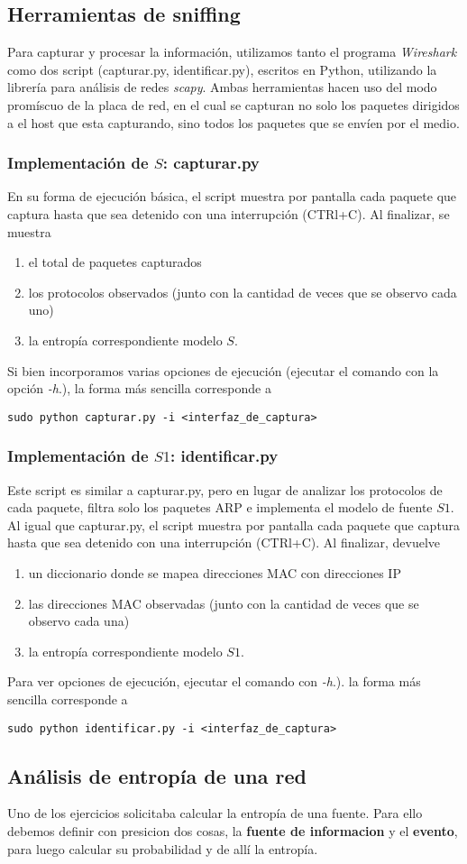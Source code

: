 \subsection{Herramientas de sniffing}

Para capturar y procesar la información, utilizamos tanto el programa \textit{Wireshark} como dos script (capturar.py, identificar.py), escritos en Python, utilizando la librería para análisis de redes \textit{scapy}. Ambas herramientas hacen uso del modo promíscuo de la placa de red, en el cual se capturan no solo los paquetes dirigidos a el host que esta capturando, sino todos los paquetes que se envíen por el medio.

\subsubsection{Implementación de $S$: capturar.py}
En su forma de ejecución básica, el script muestra por pantalla cada paquete que captura hasta que sea detenido con una interrupción (CTRl+C). Al finalizar, se muestra 
\begin{enumerate}
	\item el total de paquetes capturados
	\item los protocolos observados (junto con la cantidad de veces que se observo cada uno)
	\item la entropía correspondiente modelo $S$. 
\end{enumerate}
Si bien incorporamos varias opciones de ejecución (ejecutar el comando con la opción \textit{-h}.), la forma más sencilla corresponde a 
\begin{verbatim}
sudo python capturar.py -i <interfaz_de_captura>
\end{verbatim}

\subsubsection{Implementación de $S1$: identificar.py}
Este script es similar a capturar.py, pero en lugar de analizar los protocolos de cada paquete, filtra solo los paquetes ARP e implementa el modelo de fuente $S1$. Al igual que capturar.py, el script muestra por pantalla cada paquete que captura hasta que sea detenido con una interrupción (CTRl+C). Al finalizar, devuelve
\begin{enumerate}
	\item un diccionario donde se mapea direcciones MAC con direcciones IP
	\item las direcciones MAC observadas (junto con la cantidad de veces que se observo cada una)
	\item la entropía correspondiente modelo $S1$. 
\end{enumerate}
Para ver opciones de ejecución, ejecutar el comando con \textit{-h}.). la forma más sencilla corresponde a 
\begin{verbatim}
sudo python identificar.py -i <interfaz_de_captura>
\end{verbatim}


\subsection{Análisis de entropía de una red}
Uno de los ejercicios solicitaba calcular la entropía de una fuente.
Para ello debemos definir con presicion dos cosas, la \textbf{fuente de informacion} y el \textbf{evento}, para luego calcular su probabilidad
y de allí la entropía.
